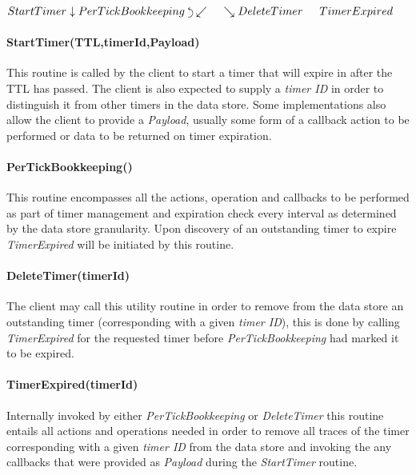 \documentclass[conference]{IEEEtran}
\newcommand{\backtrackarrow}{\rotatebox[origin=c]{-90}{$\curvearrowleft$}}
\begin{document}
\begin{center}
	$
	StartTimer \linebreak 
	\downarrow \linebreak  
	PerTickBookkeeping \hspace{1mm} \backtrackarrow \linebreak 
	\swarrow  \hspace{15pt}  \searrow \linebreak 
	DeleteTimer \hspace{15pt} TimerExpired
	$
\end{center}


\paragraph{\textbf{StartTimer(TTL,timerId,Payload)}} This routine is called by the client to start a timer that will expire in after the TTL has passed. The client is also expected to supply a \textit{timer ID} in order to distinguish it from other timers in the data store. Some implementations also allow the client to provide a \textit{Payload}, usually some form of a callback action to be performed or data to be returned on timer expiration.

\paragraph{\textbf{PerTickBookkeeping()}} This routine encompasses all the actions, operation and callbacks to be performed as part of timer management and expiration check every interval as determined by the data store granularity. Upon discovery of an outstanding timer to expire \textit{TimerExpired} will be initiated by this routine.

\paragraph{\textbf{DeleteTimer(timerId)}} The client may call this utility routine in order to remove from the data store an outstanding timer (corresponding with a given \textit{timer ID}), this is done by calling \textit{TimerExpired} for the requested timer before \textit{PerTickBookkeeping} had marked it to be expired.

\paragraph{\textbf{TimerExpired(timerId})} Internally invoked by either \textit{PerTickBookkeeping} or \textit{DeleteTimer} this routine entails all actions and operations needed in order to remove all traces of the timer corresponding with a given \textit{timer ID} from the data store and invoking the any callbacks that were provided as \textit{Payload} during the \textit{StartTimer} routine.
\end{document}
